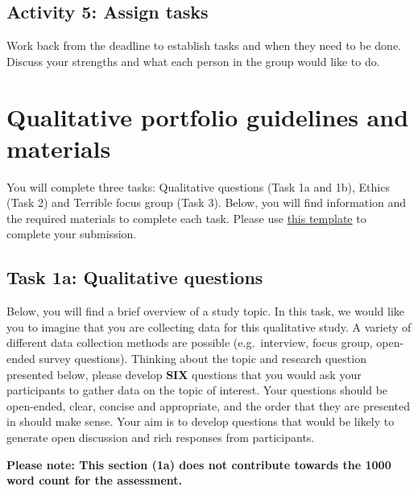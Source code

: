 \documentclass[
  english,
  letterpaper,
  DIV=11,
  numbers=noendperiod]{scrreprt}
\begin{document}
\subsection{Activity 5: Assign tasks}\label{activity-5-assign-tasks}

Work back from the deadline to establish tasks and when they need to be
done. Discuss your strengths and what each person in the group would
like to do.

\section{Qualitative portfolio guidelines and
materials}\label{qualitative-portfolio-guidelines-and-materials}

You will complete three tasks: Qualitative questions (Task 1a and 1b),
Ethics (Task 2) and Terrible focus group (Task 3). Below, you will find
information and the required materials to complete each task. Please use
\href{https://gla-my.sharepoint.com/:w:/g/personal/ashley_robertson_glasgow_ac_uk/EeFbaG-CE0pEnWBvsAwGIXUBIR8wAoFdJYYhklHoUKkEjg?e=DTA61b}{this
template} to complete your submission.

\subsection{Task 1a: Qualitative
questions}\label{task-1a-qualitative-questions}

Below, you will find a brief overview of a study topic. In this task, we
would like you to imagine that you are collecting data for this
qualitative study. A variety of different data collection methods are
possible (e.g.~interview, focus group, open-ended survey questions).
Thinking about the topic and research question presented below, please
develop \textbf{SIX} questions that you would ask your participants to
gather data on the topic of interest. Your questions should be
open-ended, clear, concise and appropriate, and the order that they are
presented in should make sense. Your aim is to develop questions that
would be likely to generate open discussion and rich responses from
participants.

\textbf{Please note: This section (1a) does not contribute towards the
1000 word count for the assessment.}
\end{document}
